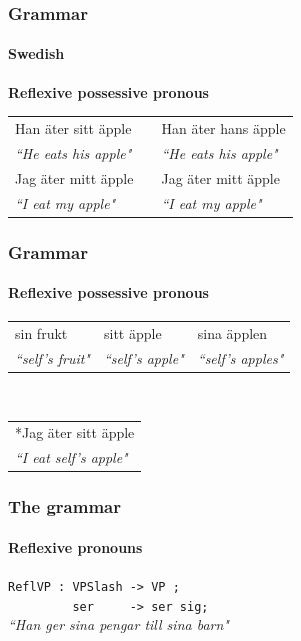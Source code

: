 \documentclass[10pt]{beamer}
\begin{document}
\begin{frame}
\frametitle{Grammar}
\framesubtitle{Swedish} 
\textbf{Reflexive possessive pronous}\\
\begin{tabular}{lll}
Han äter sitt äpple && Han äter hans äpple \\
\emph{``He eats his apple"} && \emph{``He eats his apple"} \\
Jag äter mitt äpple && Jag äter mitt äpple \\
\emph{``I eat my apple"} && \emph{``I eat my apple"} \\
\end{tabular}
\end{frame}


\begin{frame}
\frametitle{Grammar}
\framesubtitle{Reflexive possessive pronous}
\begin{tabular}{lll}
sin frukt & sitt äpple &sina äpplen \\
\emph{``{\sc self's} fruit"} & \emph{``{\sc self's} apple"} & \emph{``{\sc self's} apples"} \\
\end{tabular}
\\
\vspace{5mm}
\begin{tabular}{l}
\pause
*Jag äter sitt äpple \\
\emph{``I eat {\sc self's} apple"} \\
\end{tabular}
\end{frame}

\begin{frame}[containsverbatim]
\frametitle{The grammar}
\framesubtitle{Reflexive pronouns} 
\verb|ReflVP : VPSlash -> VP ;| \\
{\verb|         ser     -> ser sig;| }\\
\vspace{2mm}
\emph{``Han ger sina pengar till sina barn"}
\end{frame}
\end{document}
